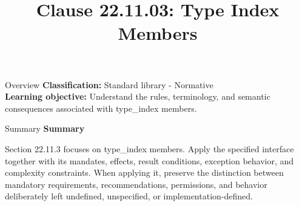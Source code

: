 \documentclass[10pt,letterpaper]{article}
\title{Clause 22.11.03: Type Index Members}
\author{}
\date{}
\begin{document}
\maketitle
\begin{CornellOverviewBox}{Overview}
\textbf{Classification:} Standard library - Normative\\[2pt]
\textbf{Learning objective:} Understand the rules, terminology, and semantic consequences associated with type\_index members.
\end{CornellOverviewBox}\begin{CornellSummaryBox}{Summary}
{\sffamily\bfseries\color{Accent} Summary}\par\vspace{3pt}Section 22.11.3 focuses on type\_index members. Apply the specified interface together with its mandates, effects, result conditions, exception behavior, and complexity constraints. When applying it, preserve the distinction between mandatory requirements, recommendations, permissions, and behavior deliberately left undefined, unspecified, or implementation-defined.
\end{CornellSummaryBox}
\end{document}
